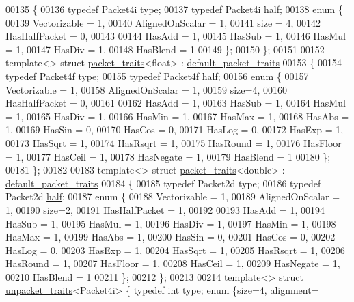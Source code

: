 \begin{DoxyCode}
{00135 \{
00136   \textcolor{keyword}{typedef} Packet4i type;
00137   \textcolor{keyword}{typedef} Packet4i \hyperlink{struct_eigen_1_1half}{half};
00138   \textcolor{keyword}{enum} \{
00139     Vectorizable = 1,
00140     AlignedOnScalar = 1,
00141     size = 4,
00142     HasHalfPacket = 0,
00143 
00144     HasAdd  = 1,
00145     HasSub  = 1,
00146     HasMul  = 1,
00147     HasDiv  = 1,
00148     HasBlend = 1
00149   \};
00150 \};
00151 
00152 \textcolor{keyword}{template}<> \textcolor{keyword}{struct }\hyperlink{struct_eigen_1_1internal_1_1packet__traits}{packet\_traits}<float> : \hyperlink{struct_eigen_1_1internal_1_1default__packet__traits}{default\_packet\_traits}
00153 \{
00154   \textcolor{keyword}{typedef} \hyperlink{struct_eigen_1_1internal_1_1_packet4f}{Packet4f} type;
00155   \textcolor{keyword}{typedef} \hyperlink{struct_eigen_1_1internal_1_1_packet4f}{Packet4f} \hyperlink{struct_eigen_1_1half}{half};
00156   \textcolor{keyword}{enum} \{
00157     Vectorizable = 1,
00158     AlignedOnScalar = 1,
00159     size=4,
00160     HasHalfPacket = 0,
00161 
00162     HasAdd  = 1,
00163     HasSub  = 1,
00164     HasMul  = 1,
00165     HasDiv  = 1,
00166     HasMin  = 1,
00167     HasMax  = 1,
00168     HasAbs  = 1,
00169     HasSin  = 0,
00170     HasCos  = 0,
00171     HasLog  = 0,
00172     HasExp  = 1,
00173     HasSqrt = 1,
00174     HasRsqrt = 1,
00175     HasRound = 1,
00176     HasFloor = 1,
00177     HasCeil = 1,
00178     HasNegate = 1,
00179     HasBlend = 1
00180   \};
00181 \};
00182 
00183 \textcolor{keyword}{template}<> \textcolor{keyword}{struct }\hyperlink{struct_eigen_1_1internal_1_1packet__traits}{packet\_traits}<double> : \hyperlink{struct_eigen_1_1internal_1_1default__packet__traits}{default\_packet\_traits}
00184 \{
00185   \textcolor{keyword}{typedef} Packet2d type;
00186   \textcolor{keyword}{typedef} Packet2d \hyperlink{struct_eigen_1_1half}{half};
00187   \textcolor{keyword}{enum} \{
00188     Vectorizable = 1,
00189     AlignedOnScalar = 1,
00190     size=2,
00191     HasHalfPacket = 1,
00192 
00193     HasAdd  = 1,
00194     HasSub  = 1,
00195     HasMul  = 1,
00196     HasDiv  = 1,
00197     HasMin  = 1,
00198     HasMax  = 1,
00199     HasAbs  = 1,
00200     HasSin  = 0,
00201     HasCos  = 0,
00202     HasLog  = 0,
00203     HasExp  = 1,
00204     HasSqrt = 1,
00205     HasRsqrt = 1,
00206     HasRound = 1,
00207     HasFloor = 1,
00208     HasCeil = 1,
00209     HasNegate = 1,
00210     HasBlend = 1
00211   \};
00212 \};
00213 
00214 \textcolor{keyword}{template}<> \textcolor{keyword}{struct }\hyperlink{struct_eigen_1_1internal_1_1unpacket__traits}{unpacket\_traits}<Packet4i> \{ \textcolor{keyword}{typedef} \textcolor{keywordtype}{int}    type; \textcolor{keyword}{enum} \{size=4, alignment=
}
\end{DoxyCode}

